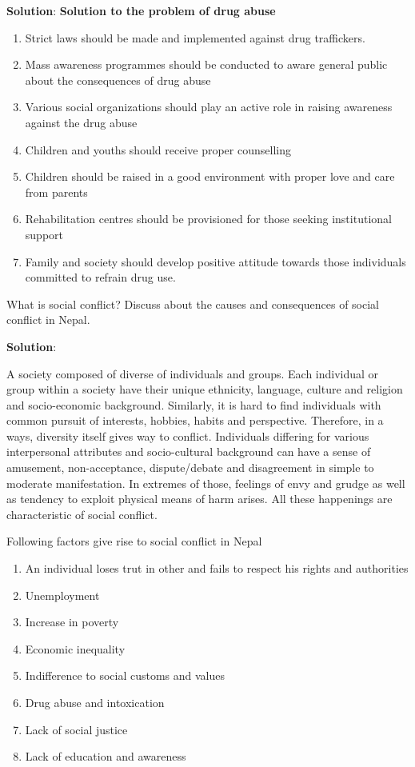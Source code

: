 \documentclass[
]{book}
\newcommand{\question}{\item}
\newenvironment{solution}{ {\bfseries Solution}:}{}
\begin{document}
\begin{questions}
\begin{solution}
\textbf{Solution to the problem of drug abuse}
\begin{enumerate}
\item Strict laws should be made and implemented against drug traffickers.
\item Mass awareness programmes should be conducted to aware general public about the consequences of drug abuse
\item Various social organizations should play an active role in raising awareness against the drug abuse
\item Children and youths should receive proper counselling
\item Children should be raised in a good environment with proper love and care from parents
\item Rehabilitation centres should be provisioned for those seeking institutional support
\item Family and society should develop positive attitude towards those individuals committed to refrain drug use.
\end{enumerate}
\end{solution}

\question What is social conflict? Discuss about the causes and consequences of social conflict in Nepal.

\begin{solution}

A society composed of diverse of individuals and groups. Each individual or group within a society have their unique ethnicity, language, culture and religion and socio-economic background. Similarly, it is hard to find individuals with common pursuit of interests, hobbies, habits and perspective. Therefore, in a ways, diversity itself gives way to conflict. Individuals differing for various interpersonal attributes and socio-cultural background can have a sense of amusement, non-acceptance, dispute/debate and disagreement in simple to moderate manifestation. In extremes of those, feelings of envy and grudge as well as tendency to exploit physical means of harm arises. All these happenings are characteristic of social conflict.

Following factors give rise to social conflict in Nepal

\begin{enumerate}
\item An individual loses trut in other and fails to respect his rights and authorities
\item Unemployment
\item Increase in poverty
\item Economic inequality
\item Indifference to social customs and values
\item Drug abuse and intoxication
\item Lack of social justice
\item Lack of education and awareness
\end{enumerate}


\end{solution}
\end{questions}
\end{document}
